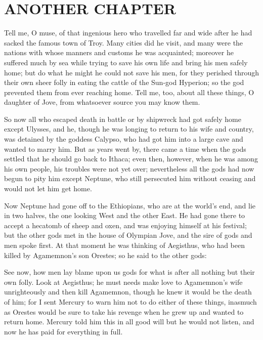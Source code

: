 \chapter{ANOTHER CHAPTER}
Tell me, O muse, of that ingenious hero who travelled far and wide after he had sacked the famous town of Troy. Many cities did he visit, and many were the nations with whose manners and customs he was acquainted; moreover he suffered much by sea while trying to save his own life and bring his men safely home; but do what he might he could not save his men, for they perished through their own sheer folly in eating the cattle of the Sun-god Hyperion; so the god prevented them from ever reaching home. Tell me, too, about all these things, O daughter of Jove, from whatsoever source you may know them.

So now all who escaped death in battle or by shipwreck had got safely home except Ulysses, and he, though he was longing to return to his wife and country, was detained by the goddess Calypso, who had got him into a large cave and wanted to marry him. But as years went by, there came a time when the gods settled that he should go back to Ithaca; even then, however, when he was among his own people, his troubles were not yet over; nevertheless all the gods had now begun to pity him except Neptune, who still persecuted him without ceasing and would not let him get home.

Now Neptune had gone off to the Ethiopians, who are at the world's end, and lie in two halves, the one looking West and the other East. He had gone there to accept a hecatomb of sheep and oxen, and was enjoying himself at his festival; but the other gods met in the house of Olympian Jove, and the sire of gods and men spoke first. At that moment he was thinking of Aegisthus, who had been killed by Agamemnon's son Orestes; so he said to the other gods:

See now, how men lay blame upon us gods for what is after all nothing but their own folly. Look at Aegisthus; he must needs make love to Agamemnon's wife unrighteously and then kill Agamemnon, though he knew it would be the death of him; for I sent Mercury to warn him not to do either of these things, inasmuch as Orestes would be sure to take his revenge when he grew up and wanted to return home. Mercury told him this in all good will but he would not listen, and now he has paid for everything in full.

